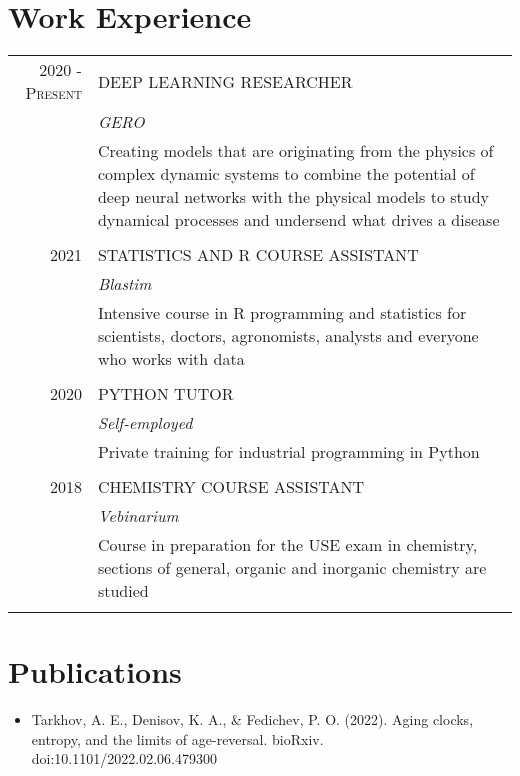\section{Work Experience}
\begin{tabular}{r|p{11cm}}

\textsc{2020 - Present}& \textsc{DEEP LEARNING RESEARCHER} \\\textsc{}&\emph{GERO} \\&\footnotesize{Creating models that are originating from the physics of complex dynamic systems to combine the potential of deep neural networks with the physical models to study dynamical processes and undersend what drives a disease} \\\multicolumn{2}{c}{}\\

\textsc{2021}& \textsc{STATISTICS AND R COURSE ASSISTANT} \\\textsc{}&\emph{Blastim} \\&\footnotesize{Intensive course in R programming and statistics for scientists, doctors, agronomists, analysts and everyone who works with data} \\\multicolumn{2}{c}{}\\

\textsc{2020}& \textsc{PYTHON TUTOR} \\\textsc{}&\emph{Self-employed} \\&\footnotesize{Private training for industrial programming in Python} 
\\\multicolumn{2}{c}{}\\

\textsc{2018}& \textsc{CHEMISTRY COURSE ASSISTANT} \\\textsc{}&\emph{Vebinarium} \\&\footnotesize{Course in preparation for the USE exam in chemistry, sections of general, organic and inorganic chemistry are studied} \\\multicolumn{2}{c}{}\\

\end{tabular}

\section{Publications}
\begin{itemize}
\item Tarkhov, A. E., Denisov, K. A., & Fedichev, P. O. (2022). Aging clocks, entropy, and the limits of age-reversal. bioRxiv. doi:10.1101/2022.02.06.479300
\end{itemize}

